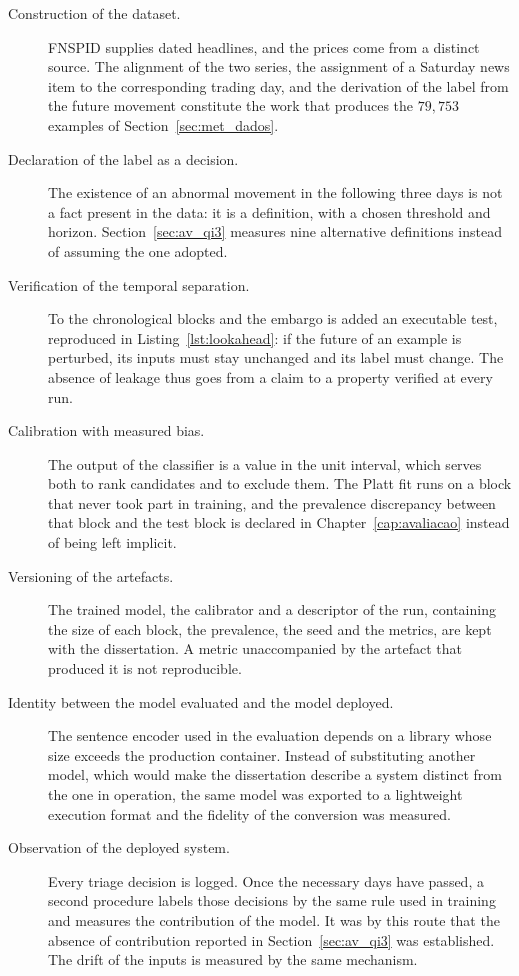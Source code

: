 \begin{description}
  \item[Construction of the dataset.] \gls{FNSPID} supplies dated headlines, and the prices come
        from a distinct source. The alignment of the two series, the assignment of a Saturday news
        item to the corresponding trading day, and the derivation of the label from the future
        movement constitute the work that produces the $79{,}753$ examples of
        Section~\ref{sec:met_dados}.

  \item[Declaration of the label as a decision.] The existence of an abnormal movement in the
        following three days is not a fact present in the data: it is a definition, with a chosen
        threshold and horizon. Section~\ref{sec:av_qi3} measures nine alternative definitions
        instead of assuming the one adopted.

  \item[Verification of the temporal separation.] To the chronological blocks and the embargo is
        added an executable test, reproduced in Listing~\ref{lst:lookahead}: if the future of an
        example is perturbed, its inputs must stay unchanged and its label must change. The
        absence of leakage thus goes from a claim to a property verified at every run.

  \item[Calibration with measured bias.] The output of the classifier is a value in the unit
        interval, which serves both to rank candidates and to exclude them. The Platt fit runs on a
        block that never took part in training, and the prevalence discrepancy between that block
        and the test block is declared in Chapter~\ref{cap:avaliacao} instead of being left
        implicit.

  \item[Versioning of the artefacts.] The trained model, the calibrator and a descriptor of the
        run, containing the size of each block, the prevalence, the seed and the metrics, are kept
        with the dissertation. A metric unaccompanied by the artefact that produced it is not
        reproducible.

  \item[Identity between the model evaluated and the model deployed.] The sentence encoder used in
        the evaluation depends on a library whose size exceeds the production container. Instead of
        substituting another model, which would make the dissertation describe a system distinct
        from the one in operation, the same model was exported to a lightweight execution format
        and the fidelity of the conversion was measured.

  \item[Observation of the deployed system.] Every triage decision is logged. Once the necessary
        days have passed, a second procedure labels those decisions by the same rule used in
        training and measures the contribution of the model. It was by this route that the absence
        of contribution reported in Section~\ref{sec:av_qi3} was established. The drift of the
        inputs is measured by the same mechanism.
\end{description}

